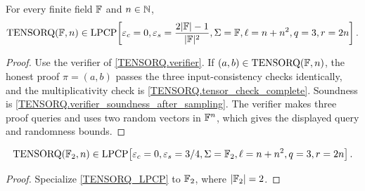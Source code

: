 \begin{theorem}\label{TENSORQ_LPCP}\leanok
For every finite field \(\mathbb{F}\) and \(n \in \mathbb{N}\),
\[
  \mathrm{TENSORQ}(\mathbb{F}, n) \in
  \mathrm{LPCP}\!\left[
    \varepsilon_c = 0,
    \varepsilon_s = \frac{2|\mathbb{F}|-1}{|\mathbb{F}|^2},
    \Sigma = \mathbb{F},
    \ell = n + n^2,
    q = 3,
    r = 2n
  \right].
\]
\end{theorem}
\begin{proof}\leanok
Use the verifier of \ref{TENSORQ.verifier}. If
\((a,b)\in\mathrm{TENSORQ}(\mathbb{F},n)\), the honest proof \(\pi=(a,b)\) passes the
three input-consistency checks identically, and the multiplicativity check is
\ref{TENSORQ.tensor_check_complete}. Soundness is
\ref{TENSORQ.verifier_soundness_after_sampling}. The verifier makes three proof
queries and uses two random vectors in \(\mathbb{F}^n\), which gives the displayed query
and randomness bounds.
\end{proof}

\begin{corollary}\label{TENSORQ_LPCP_Zmod2}\leanok
\[
  \mathrm{TENSORQ}(\mathbb{F}_2, n) \in
  \mathrm{LPCP}\!\left[
    \varepsilon_c = 0,
    \varepsilon_s = 3 / 4,
    \Sigma = \mathbb{F}_2,
    \ell = n + n^2,
    q = 3,
    r = 2 n
  \right].
\]
\end{corollary}
\begin{proof}\leanok
Specialize \ref{TENSORQ_LPCP} to \(\mathbb{F}_2\), where \(|\mathbb{F}_2|=2\).
\end{proof}
